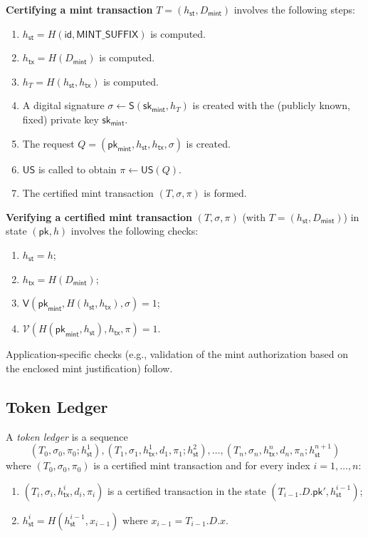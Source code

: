 \documentclass{article}
\newcommand{\sig}[0]{\mathsf{S}}
\newcommand{\sigver}[0]{\mathsf{V}}
\newcommand{\pubkey}[0]{\mathsf{pk}}
\newcommand{\prikey}[0]{\mathsf{sk}}
\newcommand{\unisrv}[0]{\mathsf{US}}
\newcommand{\sthash}[0]{h_\mathsf{st}}
\newcommand{\txhash}[0]{h_\mathsf{tx}}
\newcommand{\univer}[0]{\mathcal{V}}
\begin{document}
\noindent\textbf{Certifying a mint transaction} $T = (\sthash, D_\mathsf{mint})$ involves the following steps:
\begin{enumerate}
    \item $\sthash = H(\mathsf{id}, \mathsf{MINT\_SUFFIX})$ is computed.
	\item $\txhash = H(D_\mathsf{mint})$ is computed.
	\item $h_T = H(\sthash, \txhash)$ is computed.
	\item A digital signature $\sigma \gets \sig(\prikey_\mathsf{mint}, h_T)$ is created with the (publicly known, fixed) private key $\prikey_\mathsf{mint}$.
	\item The request $Q = (\pubkey_\mathsf{mint},\sthash,\txhash,\sigma)$ is created.
	\item $\unisrv$ is called to obtain $\pi\gets \unisrv(Q)$.
	\item The certified mint transaction $(T,\sigma,\pi)$ is formed.
\end{enumerate}

\noindent\textbf{Verifying a certified mint transaction} $(T,\sigma,\pi)$ (with $T=(\sthash, D_\mathsf{mint})$) in state $(\pubkey,h)$ involves the following checks:
\begin{enumerate}
	\item $\sthash=h$;
	\item $\txhash = H(D_\mathsf{mint})$;
	\item $\sigver(\pubkey_\mathsf{mint}, H(\sthash,\txhash),\sigma)=1$;
	\item $\univer(H(\pubkey_\mathsf{mint},\sthash),\txhash,\pi)=1$.
\end{enumerate}

\noindent Application-specific checks (e.g., validation of the mint authorization based on the enclosed mint justification) follow.

\subsection{Token Ledger}

A \emph{token ledger} is a sequence
\[
(T_0, \sigma_0, \pi_0; h^1_\mathsf{st}), (T_1, \sigma_1,\txhash^1,d_1,\pi_1; h^2_\mathsf{st}), \ldots, (T_n, \sigma_n, \txhash^n, d_n,\pi_n; h^{n+1}_\mathsf{st})
\]
where $(T_0, \sigma_0, \pi_0)$ is a certified mint transaction and for every index $i=1,\ldots, n$:
\begin{enumerate}
\item $(T_{i}, \sigma_{i}, \txhash^i,d_i, \pi_{i})$ is a certified transaction in the state $(T_{i-1}.D.\pubkey', h^{i-1}_\mathsf{st})$;
\item $h^{i}_\mathsf{st}=H(h^{i-1}_\mathsf{st},x_{i-1})$ where $x_{i-1} =T_{i-1}.D.x$.
\end{enumerate}
\end{document}
